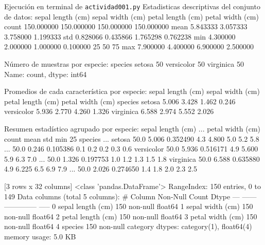 \documentclass[11pt,letterpaper]{article}
\begin{document}
\begin{consola}[label=out:iris]{Ejecución en terminal de \texttt{actividad001.py}}
Estadisticas descriptivas del conjunto de datos:
       sepal length (cm)  sepal width (cm)  petal length (cm)  petal width (cm)
count         150.000000        150.000000         150.000000        150.000000
mean            5.843333          3.057333           3.758000          1.199333
std             0.828066          0.435866           1.765298          0.762238
min             4.300000          2.000000           1.000000          0.100000
25%
50%
75%
max             7.900000          4.400000           6.900000          2.500000



Número de muestras por especie:
species
setosa        50
versicolor    50
virginica     50
Name: count, dtype: int64



Promedios de cada característica por especie:
            sepal length (cm)  sepal width (cm)  petal length (cm)  petal width (cm)
species                                                                             
setosa                  5.006             3.428              1.462             0.246
versicolor              5.936             2.770              4.260             1.326
virginica               6.588             2.974              5.552             2.026



Resumen estadístico agrupado por especie:
           sepal length (cm)                                              ... petal width (cm)                                          
                       count   mean       std  min    25%
species                                                                   ...                                                           
setosa                  50.0  5.006  0.352490  4.3  4.800  5.0  5.2  5.8  ...             50.0  0.246  0.105386  0.1  0.2  0.2  0.3  0.6
versicolor              50.0  5.936  0.516171  4.9  5.600  5.9  6.3  7.0  ...             50.0  1.326  0.197753  1.0  1.2  1.3  1.5  1.8
virginica               50.0  6.588  0.635880  4.9  6.225  6.5  6.9  7.9  ...             50.0  2.026  0.274650  1.4  1.8  2.0  2.3  2.5

[3 rows x 32 columns]
<class 'pandas.DataFrame'>
RangeIndex: 150 entries, 0 to 149
Data columns (total 5 columns):
 #   Column             Non-Null Count  Dtype   
---  ------             --------------  -----   
 0   sepal length (cm)  150 non-null    float64 
 1   sepal width (cm)   150 non-null    float64 
 2   petal length (cm)  150 non-null    float64 
 3   petal width (cm)   150 non-null    float64 
 4   species            150 non-null    category
dtypes: category(1), float64(4)
memory usage: 5.0 KB
\end{consola}

\end{document}
